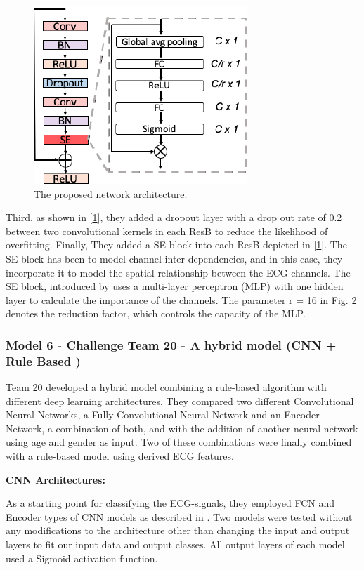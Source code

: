 \begin{figure}[H]
\centering
\includegraphics[scale=0.5]{img/team_two_network_2.png}
\caption{The proposed network architecture.}
\label{fig:team_two_network_2}
\end{figure}

Third, as shown in [\ref{fig:team_two_network_2}], they added a dropout layer with a drop out rate of 0.2 between two convolutional kernels in each ResB to reduce the likelihood of overfitting. Finally, They added a SE block into each ResB depicted in [\ref{fig:team_two_network_2}]. The SE block has been to model channel inter-dependencies, and in this case, they incorporate it to model the spatial relationship between the ECG channels. The SE block, introduced by \cite{Hu_2018_CVPR} uses a multi-layer perceptron (MLP) with one hidden layer to calculate the importance of the channels. The parameter r = 16 in Fig. 2 denotes the reduction factor, which controls the capacity of the MLP.


\subsubsection{Model 6 - Challenge Team 20 - A hybrid model (CNN + Rule Based )\cite{second_team} } \label{3model6}

Team 20 developed a hybrid model combining a rule-based algorithm with different deep learning architectures. They compared two different Convolutional Neural Networks, a Fully Convolutional Neural Network and an Encoder Network, a combination of both, and with the addition of another neural network using age and gender as input. Two of these combinations were finally combined with a rule-based model using derived ECG features. 

\textbf{CNN Architectures:}

As a starting point for classifying the ECG-signals, they employed FCN and Encoder types of CNN models as described in \cite{ismail2019deep}. Two models were tested without any modifications to the architecture other than changing the input and output layers to fit our input data and output classes. All output layers of each model used a Sigmoid activation function.

